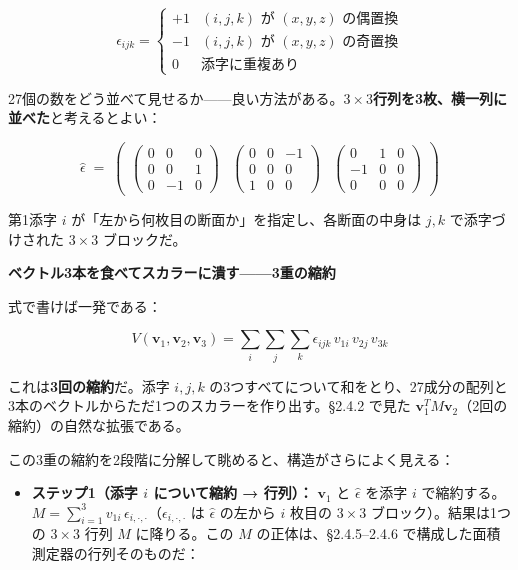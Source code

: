 \documentclass[a4paper,12pt,openany]{book}
\providecommand{\tightlist}{%
  \setlength{\itemsep}{0pt}\setlength{\parskip}{0pt}}
\begin{document}
\[
\epsilon_{ijk} = \begin{cases} +1 & (i,j,k) \text{ が } (x,y,z) \text{ の偶置換} \\ -1 & (i,j,k) \text{ が } (x,y,z) \text{ の奇置換} \\ 0 & \text{添字に重複あり} \end{cases}
\]

27個の数をどう並べて見せるか——良い方法がある。\(3 \times 3\)\textbf{行列を3枚、横一列に並べた}と考えるとよい：

\[
\widehat{\epsilon} \;{=}\;
\begin{pmatrix}
\begin{pmatrix} 0 & 0 & 0 \\ 0 & 0 & 1 \\ 0 & -1 & 0 \end{pmatrix} &
\begin{pmatrix} 0 & 0 & -1 \\ 0 & 0 & 0 \\ 1 & 0 & 0 \end{pmatrix} &
\begin{pmatrix} 0 & 1 & 0 \\ -1 & 0 & 0 \\ 0 & 0 & 0 \end{pmatrix}
\end{pmatrix}
\]

第1添字 \(i\) が「左から何枚目の断面か」を指定し、各断面の中身は \(j,k\)
で添字づけされた \(3 \times 3\) ブロックだ。

\textbf{ベクトル3本を食べてスカラーに潰す——3重の縮約}

式で書けば一発である：

\[
V(\mathbf{v}_1, \mathbf{v}_2, \mathbf{v}_3) = \sum_i\sum_j\sum_k \epsilon_{ijk}\, v_{1i}\, v_{2j}\, v_{3k}
\]

これは\textbf{3回の縮約}だ。添字 \(i, j, k\)
の3つすべてについて和をとり、27成分の配列と3本のベクトルからただ1つのスカラーを作り出す。§2.4.2
で見た
\(\mathbf{v}_1^T M \mathbf{v}_2\)（2回の縮約）の自然な拡張である。

この3重の縮約を2段階に分解して眺めると、構造がさらによく見える：

\begin{itemize}
\tightlist
\item
  \textbf{ステップ1（添字 $i$ について縮約 → 行列）：} \(\mathbf{v}_1\)
  と \(\widehat{\epsilon}\) を添字 \(i\)
  で縮約する。\(\displaystyle M = \sum_{i=1}^3 v_{1i}\,\epsilon_{i,\cdot,\cdot}\)（\(\epsilon_{i,\cdot,\cdot}\)
  は \(\widehat{\epsilon}\) の左から \(i\) 枚目の \(3 \times 3\)
  ブロック）。結果は1つの \(3 \times 3\) 行列 \(M\) に降りる。この \(M\)
  の正体は、§2.4.5–2.4.6 で構成した面積測定器の行列そのものだ：
\end{itemize}
\end{document}
